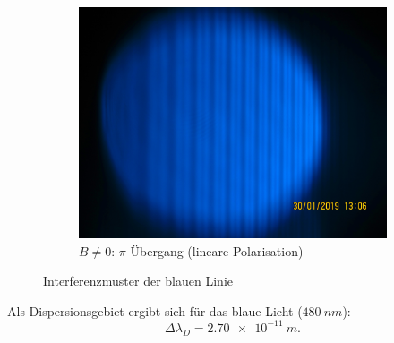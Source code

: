 \begin{figure}[h!]
\begin{subfigure}{0.49\textwidth}
      \includegraphics[width=\textwidth]{blaupi.jpeg}
      \caption{$B≠0$: $\pi$-Übergang (lineare Polarisation)}
      \label{fig:blaupi}
   \end{subfigure}
   \caption{Interferenzmuster der blauen Linie}
\end{figure}

Als Dispersionsgebiet ergibt sich für das blaue Licht ($\SI{480}{nm}$):
\begin{equation*}
  \Delta \lambda_D = \SI{2.70e-11}{m}.
\end{equation*}

